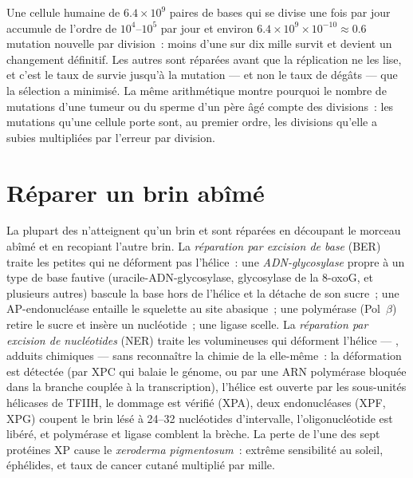 \begin{example}\label{ex:b3:dna-repair:numbers}
Une cellule humaine de $6.4\times 10^{9}$ paires de bases qui se divise
une fois par jour accumule de l'ordre de $10^{4}$--$10^{5}$  par
jour et environ $6.4\times 10^{9}\times 10^{-10} \approx 0.6$ mutation
nouvelle par division~: moins d'une  sur dix mille survit et
devient un changement définitif. Les autres sont réparées avant que la
réplication ne les lise, et c'est le taux de survie jusqu'à la mutation
--- et non le taux de dégâts --- que la sélection a minimisé. La même
arithmétique montre pourquoi le nombre de mutations d'une tumeur ou du
sperme d'un père âgé compte des divisions~: les mutations qu'une
cellule porte sont, au premier ordre, les divisions qu'elle a subies
multipliées par l'erreur par division.
\end{example}

\section{Réparer un brin abîmé}

\begin{definition}\label{def:b3:dna-repair:excision}
La plupart des  n'atteignent qu'un brin et sont réparées en
découpant le morceau abîmé et en recopiant l'autre brin. La
\emph{réparation par excision de base} (BER) traite les petites 
qui ne déforment pas l'hélice~: une \emph{ADN-glycosylase} propre à un
type de base fautive (uracile-ADN-glycosylase, glycosylase de la
8-oxoG, et plusieurs autres) bascule la base hors de l'hélice et la
détache de son sucre~; une AP-endonucléase entaille le squelette au
site abasique~; une polymérase (Pol~$\beta$) retire le sucre et insère
un nucléotide~; une ligase scelle. La \emph{réparation par excision de
nucléotides} (NER) traite les  volumineuses qui déforment
l'hélice --- , adduits chimiques --- sans
reconnaître la chimie de la  elle-même~: la déformation est
détectée (par XPC qui balaie le génome, ou par une ARN polymérase
bloquée dans la branche couplée à la transcription), l'hélice est
ouverte par les sous-unités hélicases de TFIIH, le dommage est vérifié
(XPA), deux endonucléases (XPF, XPG) coupent le brin lésé à
\numrange{24}{32} nucléotides d'intervalle, l'oligonucléotide est
libéré, et polymérase et ligase comblent la brèche. La perte de l'une
des sept protéines XP cause le \emph{xeroderma pigmentosum}~: extrême
sensibilité au soleil, éphélides, et taux de cancer cutané multiplié
par mille.
\end{definition}

